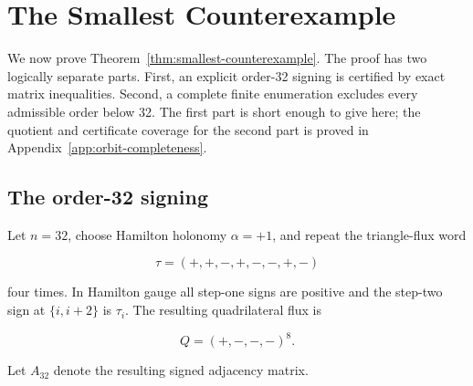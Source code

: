 \section{The Smallest Counterexample}\label{sec:smallest-counterexample}

We now prove Theorem~\ref{thm:smallest-counterexample}. The proof has two logically separate parts. First, an
explicit order-32 signing is certified by exact matrix inequalities. Second, a
complete finite enumeration excludes every admissible order below 32. The
first part is short enough to give here; the quotient and certificate coverage
for the second part is proved in Appendix~\ref{app:orbit-completeness}.

\subsection{The order-32 signing}

Let \(n=32\), choose Hamilton holonomy \(\alpha=+1\), and repeat the triangle-flux
word

\begin{equation}
\label{eq:order-thirty-two-triangle-word}
\tau=(+,+,-,+,-,-,+,-)
\end{equation}

four times. In Hamilton gauge all step-one signs are positive and the step-two
sign at \(\{i,i+2\}\) is \(\tau_i\). The resulting quadrilateral flux is

\begin{equation}
\label{eq:order-thirty-two-flux-word}
Q=(+,-,-,-)^{8}.
\end{equation}

Let \(A_{32}\) denote the resulting signed adjacency matrix.

